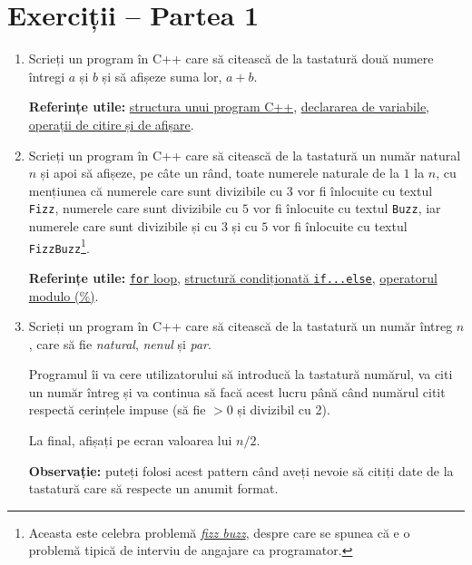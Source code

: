\section*{Exerciții -- Partea 1}

\begin{enumerate}
    \item Scrieți un program în C++ care să citească de la tastatură două numere întregi \(a\) și \(b\) și să afișeze suma lor, \(a + b\).

    \textbf{Referințe utile:} \href{https://cplusplus.com/doc/tutorial/program_structure/}{structura unui program C++}, \href{https://cplusplus.com/doc/tutorial/variables/}{declararea de variabile}, \href{https://cplusplus.com/doc/tutorial/basic_io/}{operații de citire și de afișare}.

    \item Scrieți un program în C++ care să citească de la tastatură un număr natural \(n\) și apoi să afișeze, pe câte un rând, toate numerele naturale de la \(1\) la \(n\), cu mențiunea că numerele care sunt divizibile cu \(3\) vor fi înlocuite cu textul \texttt{Fizz}, numerele care sunt divizibile cu \(5\) vor fi înlocuite cu textul \texttt{Buzz}, iar numerele care sunt divizibile și cu \(3\) și cu \(5\) vor fi înlocuite cu textul \texttt{FizzBuzz}\footnote{Aceasta este celebra problemă \href{https://en.wikipedia.org/wiki/Fizz_buzz}{\textit{fizz buzz}}, despre care se spunea că e o problemă tipică de interviu de angajare ca programator.}.

    \textbf{Referințe utile:} \href{https://www.geeksforgeeks.org/cpp-loops/}{\texttt{for} loop}, \href{https://www.tutorialspoint.com/cplusplus/cpp_if_else_statement.htm}{structură condiționată \texttt{if...else}}, \href{https://www.geeksforgeeks.org/modulo-operator-in-c-cpp-with-examples/}{operatorul modulo (\%)}.
    
    \item Scrieți un program în C++ care să citească de la tastatură un număr întreg \(n\), care să fie \emph{natural}, \emph{nenul} și \emph{par}.

    Programul îi va cere utilizatorului să introducă la tastatură numărul, va citi un număr întreg și va continua să facă acest lucru până când numărul citit respectă cerințele impuse (să fie \(> 0\) și divizibil cu 2).

    La final, afișați pe ecran valoarea lui \(n / 2\).

    \textbf{Observație:} puteți folosi acest pattern când aveți nevoie să citiți date de la tastatură care să respecte un anumit format.


\end{enumerate}
